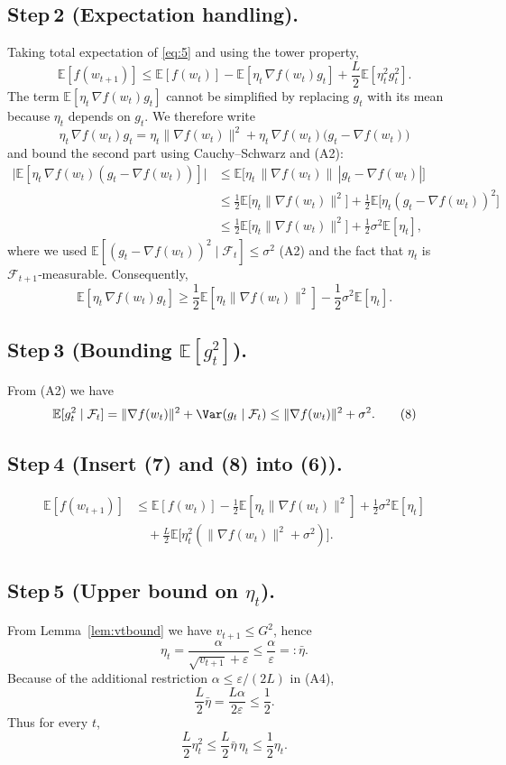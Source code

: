 \documentclass[11pt]{article}
\newcommand{\E}{\mathbb{E}}
\begin{document}
\subsection*{Step 2 (Expectation handling).}
Taking total expectation of \eqref{eq:5} and using the tower property,
\[
\E[f(w_{t+1})]\le \E[f(w_t)]-\E[\eta_t\,\nabla f(w_t)g_t]
+\frac{L}{2}\E[\eta_t^{2}g_t^{2}]. \tag{6}
\]
The term $\E[\eta_t\,\nabla f(w_t)g_t]$ cannot be simplified by
replacing $g_t$ with its mean because $\eta_t$ depends on $g_t$.
We therefore write
\[
\eta_t\,\nabla f(w_t)g_t
= \eta_t\|\nabla f(w_t)\|^{2}
   +\eta_t\,\nabla f(w_t)\bigl(g_t-\nabla f(w_t)\bigr)
\]
and bound the second part using Cauchy–Schwarz and (A2):
\[
\begin{aligned}
\big|\E[\eta_t\,\nabla f(w_t)(g_t-\nabla f(w_t))]\big|
&\le \E\!\big[\eta_t\,\|\nabla f(w_t)\|\,|g_t-\nabla f(w_t)|\big]  \\
&\le \frac12\E\!\big[\eta_t\|\nabla f(w_t)\|^{2}\big]
   +\frac12\E\!\big[\eta_t (g_t-\nabla f(w_t))^{2}\big]   \\
&\le \frac12\E\!\big[\eta_t\|\nabla f(w_t)\|^{2}\big]
   +\frac12\sigma^{2}\E[\eta_t],
\end{aligned}
\]
where we used $\E[(g_t-\nabla f(w_t))^{2}\mid\mathcal{F}_t]\le\sigma^{2}$ (A2) and the fact that $\eta_t$ is $\mathcal{F}_{t+1}$‑measurable.  Consequently,
\[
\E[\eta_t\,\nabla f(w_t)g_t]
\ge \frac12\E[\eta_t\|\nabla f(w_t)\|^{2}]
      -\frac12\sigma^{2}\E[\eta_t]. \tag{7}
\]

\subsection*{Step 3 (Bounding $\E[g_t^{2}]$).}
From (A2) we have
\[
\E[g_t^{2}\mid\mathcal{F}_t]
= \|\nabla f(w_t)\|^{2}+\Var(g_t\mid\mathcal{F}_t)
\le \|\nabla f(w_t)\|^{2}+\sigma^{2}. \tag{8}
\]

\subsection*{Step 4 (Insert (7) and (8) into (6)).}
\[
\begin{aligned}
\E[f(w_{t+1})]
&\le \E[f(w_t)]
   -\frac12\E[\eta_t\|\nabla f(w_t)\|^{2}]
   +\frac12\sigma^{2}\E[\eta_t] \\
&\quad +\frac{L}{2}\E\!\big[\eta_t^{2}
      (\|\nabla f(w_t)\|^{2}+\sigma^{2})\big].
\end{aligned}
\tag{9}
\]

\subsection*{Step 5 (Upper bound on $\eta_t$).}
From Lemma~\ref{lem:vtbound} we have $v_{t+1}\le G^{2}$, hence
\[
\eta_t
= \frac{\alpha}{\sqrt{v_{t+1}}+\varepsilon}
\le \frac{\alpha}{\varepsilon}
=: \bar\eta . \tag{10}
\]
Because of the additional restriction $\alpha\le\varepsilon/(2L)$ in (A4),
\[
\frac{L}{2}\bar\eta
= \frac{L\alpha}{2\varepsilon}
\le \frac12 . \tag{11}
\]
Thus for every $t$,
\[
\frac{L}{2}\eta_t^{2}
\le \frac{L}{2}\bar\eta\,\eta_t
\le \frac12\eta_t . \tag{12}
\]
\end{document}
